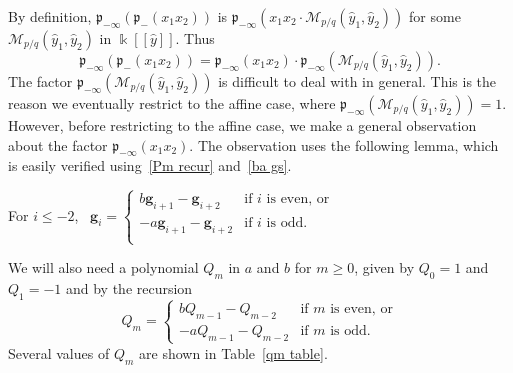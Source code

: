 \documentclass[ALCO,ThmDefs,Unicode,epreuves]{cedram}
\newcommand\llbracket{[\![}
\newcommand\rrbracket{]\!]}
\newcommand{\p}{{\mathfrak p}}
\newcommand{\g}{\mathbf{g}}
\renewcommand{\k}{\Bbbk}
\newcommand{\M}{\mathcal{M}}
\newcommand{\hy}{\hat{y}}
\begin{document}
By definition, $\p_{-\infty}(\p_-(x_1x_2))$ is $\p_{-\infty}(x_1x_2\cdot\M_{p/q}(\hy_1,\hy_2))$ for some $\M_{p/q}(\hy_1,\hy_2)$ in $\k\llbracket \hy\rrbracket $.
Thus 
\begin{equation}\label{p M}
\p_{-\infty}(\p_-(x_1x_2))=\p_{-\infty}(x_1x_2)\cdot\p_{-\infty}(\M_{p/q}(\hy_1,\hy_2)).
\end{equation}
The factor $\p_{-\infty}(\M_{p/q}(\hy_1,\hy_2))$ is difficult to deal with in general.
This is the reason we eventually restrict to the affine case, where $\p_{-\infty}(\M_{p/q}(\hy_1,\hy_2))=1$.
However, before restricting to the affine case, we make a general observation about the factor $\p_{-\infty}(x_1x_2)$.
The observation uses the following lemma, which is easily verified using~\eqref{Pm recur} and~\eqref{ba gs}.
\begin{lemma}\label{deal with gs}
For $i\le-2$, \,
$\g_i=\begin{cases}
b\g_{i+1}-\g_{i+2}&\text{if }i\text{ is even, or}\\
-a\g_{i+1}-\g_{i+2}&\text{if }i\text{ is odd.}\\
\end{cases}$
\end{lemma}


We will also need a polynomial $Q_m$ in $a$ and $b$ for $m\ge0$, given by $Q_0=1$ and $Q_1=-1$ and by the recursion 
\begin{equation}\label{Qm recur}
Q_m=\begin{cases}
bQ_{m-1}-Q_{m-2}&\text{if }m\text{ is even, or}\\
-aQ_{m-1}-Q_{m-2}&\text{if }m\text{ is odd.}
\end{cases}
\end{equation}
Several values of $Q_m$ are shown in Table~\ref{qm table}.
\end{document}
